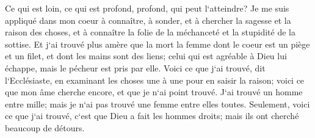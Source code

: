 \verse Ce qui est loin, ce qui est profond, profond, qui peut l`atteindre? 
\verse Je me suis appliqué dans mon coeur à connaître, à sonder, et à chercher la sagesse et la raison des choses, et à connaître la folie de la méchanceté et la stupidité de la sottise. 
\verse Et j`ai trouvé plus amère que la mort la femme dont le coeur est un piège et un filet, et dont les mains sont des liens; celui qui est agréable à Dieu lui échappe, mais le pécheur est pris par elle. 
\verse Voici ce que j`ai trouvé, dit l`Ecclésiaste, en examinant les choses une à une pour en saisir la raison; 
\verse voici ce que mon âme cherche encore, et que je n`ai point trouvé. J`ai trouvé un homme entre mille; mais je n`ai pas trouvé une femme entre elles toutes. 
\verse Seulement, voici ce que j`ai trouvé, c`est que Dieu a fait les hommes droits; mais ils ont cherché beaucoup de détours. 

\chapter{}

